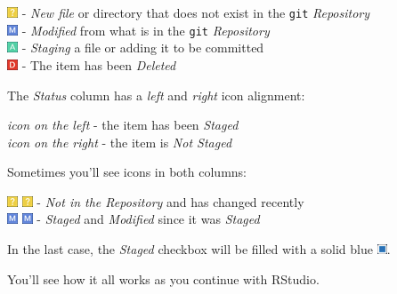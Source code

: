 \documentclass[]{book}
\theoremstyle{definition}
\theoremstyle{definition}
\theoremstyle{definition}
\theoremstyle{remark}
\begin{document}
\includegraphics{images/git-yellow-N.png} - \emph{New file} or directory
that does not exist in the \texttt{git} \emph{Repository}\\
\includegraphics{images/git-blue-M.png} - \emph{Modified} from what is
in the \texttt{git} \emph{Repository}\\
\includegraphics{images/git-green-A.png} - \emph{Staging} a file or
adding it to be committed\\
\includegraphics{images/git-red-D.png} - The item has been
\emph{Deleted}

The \emph{Status} column has a \emph{left} and \emph{right} icon
alignment:

\emph{icon on the left} - the item has been \emph{Staged}\\
\emph{icon on the right} - the item is \emph{Not Staged}

Sometimes you'll see icons in both columns:

\includegraphics{images/git-yellow-N.png}
\includegraphics{images/git-yellow-N.png} - \emph{Not in the Repository}
and has changed recently\\
\includegraphics{images/git-blue-M.png}
\includegraphics{images/git-blue-M.png} - \emph{Staged} and
\emph{Modified} since it was \emph{Staged}

In the last case, the \emph{Staged} checkbox will be filled with a solid
blue \includegraphics{images/git-blue-button.png}.

You'll see how it all works as you continue with RStudio.
\end{document}
